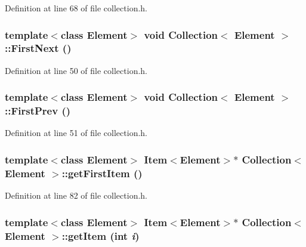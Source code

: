 Definition at line 68 of file collection.h.\hypertarget{classCollection_c0f247418e298e0723bccd1f333ba94c}{
\subsubsection[{FirstNext}]{\setlength{\rightskip}{0pt plus 5cm}template$<$class Element$>$ void {\bf Collection}$<$ Element $>$::FirstNext ()}}
\label{classCollection_c0f247418e298e0723bccd1f333ba94c}




Definition at line 50 of file collection.h.\hypertarget{classCollection_512a3f686fb0676fc9b76750b81cfb6c}{
\subsubsection[{FirstPrev}]{\setlength{\rightskip}{0pt plus 5cm}template$<$class Element$>$ void {\bf Collection}$<$ Element $>$::FirstPrev ()}}
\label{classCollection_512a3f686fb0676fc9b76750b81cfb6c}




Definition at line 51 of file collection.h.\hypertarget{classCollection_e98ed52c991335611a6b1ef313ca4f10}{
\subsubsection[{getFirstItem}]{\setlength{\rightskip}{0pt plus 5cm}template$<$class Element$>$ {\bf Item}$<$Element$>$$\ast$ {\bf Collection}$<$ Element $>$::getFirstItem ()}}
\label{classCollection_e98ed52c991335611a6b1ef313ca4f10}




Definition at line 82 of file collection.h.\hypertarget{classCollection_7b9cb5b38e5c0cffba982b61e4f86376}{
\subsubsection[{getItem}]{\setlength{\rightskip}{0pt plus 5cm}template$<$class Element$>$ {\bf Item}$<$Element$>$$\ast$ {\bf Collection}$<$ Element $>$::getItem (int {\em i})}}
\label{classCollection_7b9cb5b38e5c0cffba982b61e4f86376}




